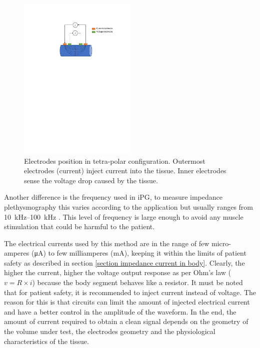 \begin{figure}[!htpb]
	\centering
	\includegraphics[width=0.5\textwidth,keepaspectratio]{tetrapolar_impedance}    
	\caption[Electrodes position in tetra-polar configuration]{Electrodes position in tetra-polar configuration. Outermost electrodes (current) inject current into the tissue. Inner electrodes sense the voltage drop caused by the tissue.}
	\label{fig:tetrapolar iPG}
\end{figure}

Another difference is the frequency used in iPG, to measure impedance plethysmography this varies according to the application but usually ranges from \SIrange{10}{100}{\kilo\hertz} \cite{songer2001tissue,casas1999vivo,kun1994tissue,ristic1997muscle}. This level of frequency is large enough to avoid any muscle stimulation that could be harmful to the patient. 

The electrical currents used by this method are in the range of few micro-amperes (\si{\micro\ampere}) to few milliamperes (\si{\milli\ampere}), keeping it within the limits of patient safety as described in section \ref{section impedance current in body}. Clearly, the higher the current, higher the voltage output response as per Ohm's law ($v = R \times i$) because the body segment behaves like a resistor. It must be noted that for patient safety, it is recommended to inject current instead of voltage. The reason for this is that circuits can limit the amount of injected electrical current and have a better control in the amplitude of the waveform. In the end, the amount of current required to obtain a clean signal depends on the geometry of the volume under test, the electrodes geometry and the physiological characteristics of the tissue. 

